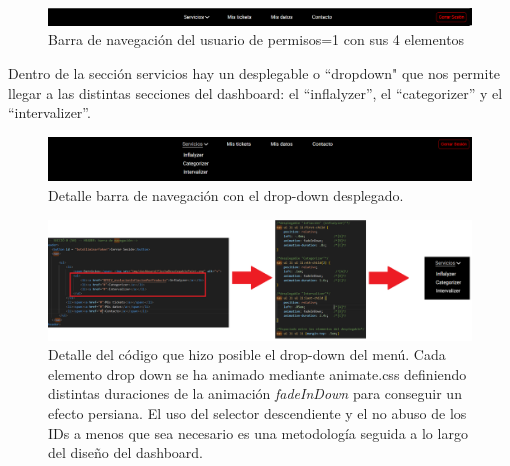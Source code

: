 \documentclass[a4paper,12pt]{report}
\begin{document}
	\FloatBarrier
	\setlength{\abovecaptionskip}{3pt}
	\begin{figure}[H]
		\centering
		\caption{Barra de navegación del usuario de permisos=1 con sus 4 elementos}
		\includegraphics[width=1\linewidth]{img/barraNavegacioDashboardPERMISOS1}

		\label{fig:barranavegaciodashboardpermisos1}
	\end{figure}
	\FloatBarrier
	
	Dentro de la sección servicios hay un desplegable o ``dropdown" que nos permite llegar a las distintas secciones del dashboard: el ``inflalyzer'', el ``categorizer'' y el ``intervalizer''.
	
	\FloatBarrier
	\setlength{\belowcaptionskip}{3pt}
	\begin{figure}[H]
		\centering
		\caption{Detalle barra de navegación con el drop-down desplegado.}
		\includegraphics[width=1\linewidth]{img/barraNavegacioDashboardPERMISOS1dropDown}
		
		\label{fig:barranavegaciodashboardpermisos1dropdown}
	\end{figure}
	\FloatBarrier
	
	
	\FloatBarrier
	\setlength{\belowcaptionskip}{0pt}
	\begin{figure}[H]
		\centering
		\caption{Detalle del código que hizo posible el drop-down del menú. Cada elemento drop down se ha animado mediante animate.css definiendo distintas duraciones de la animación \textit{fadeInDown} para conseguir un efecto persiana. El uso del selector descendiente y el no abuso de los IDs a menos que sea necesario es una metodología seguida a lo largo del diseño del dashboard.}
		\includegraphics[width=1\linewidth]{img/navBarDesplegadaMakingOfPermisos1.png}

		\label{fig:detalleNavbarDesplegadaCodi}
	\end{figure}
	\FloatBarrier
	
\end{document}
